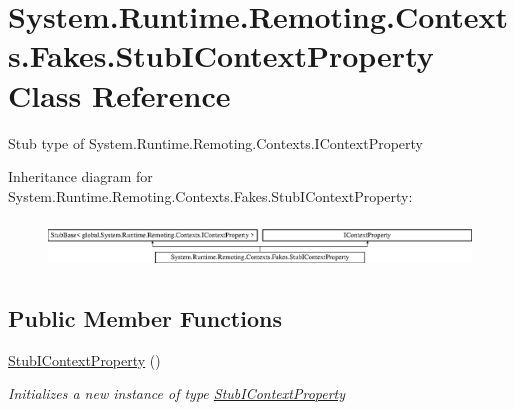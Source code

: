 \hypertarget{class_system_1_1_runtime_1_1_remoting_1_1_contexts_1_1_fakes_1_1_stub_i_context_property}{\section{System.\-Runtime.\-Remoting.\-Contexts.\-Fakes.\-Stub\-I\-Context\-Property Class Reference}
\label{class_system_1_1_runtime_1_1_remoting_1_1_contexts_1_1_fakes_1_1_stub_i_context_property}
}


Stub type of System.\-Runtime.\-Remoting.\-Contexts.\-I\-Context\-Property 


Inheritance diagram for System.\-Runtime.\-Remoting.\-Contexts.\-Fakes.\-Stub\-I\-Context\-Property\-:\begin{figure}[H]
\begin{center}
\leavevmode
\includegraphics[height=1.308411cm]{class_system_1_1_runtime_1_1_remoting_1_1_contexts_1_1_fakes_1_1_stub_i_context_property}
\end{center}
\end{figure}
\subsection*{Public Member Functions}
\begin{DoxyCompactItemize}
\item 
\hyperlink{class_system_1_1_runtime_1_1_remoting_1_1_contexts_1_1_fakes_1_1_stub_i_context_property_a14dd9d5d1801f8ed83823abb814d5efb}{Stub\-I\-Context\-Property} ()
\begin{DoxyCompactList}\small\item\em Initializes a new instance of type \hyperlink{class_system_1_1_runtime_1_1_remoting_1_1_contexts_1_1_fakes_1_1_stub_i_context_property}{Stub\-I\-Context\-Property}\end{DoxyCompactList}\end{DoxyCompactItemize}
